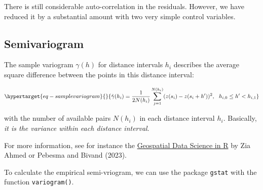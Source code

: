 \documentclass[
  letterpaper,
  DIV=11,
  numbers=noendperiod]{scrreprt}
\newenvironment{Shaded}{\begin{snugshade}}{\end{snugshade}}
\newcommand{\AttributeTok}[1]{\textcolor[rgb]{0.40,0.45,0.13}{#1}}
\newcommand{\CommentTok}[1]{\textcolor[rgb]{0.37,0.37,0.37}{#1}}
\newcommand{\DecValTok}[1]{\textcolor[rgb]{0.68,0.00,0.00}{#1}}
\newcommand{\FloatTok}[1]{\textcolor[rgb]{0.68,0.00,0.00}{#1}}
\newcommand{\FunctionTok}[1]{\textcolor[rgb]{0.28,0.35,0.67}{#1}}
\newcommand{\NormalTok}[1]{\textcolor[rgb]{0.00,0.23,0.31}{#1}}
\newcommand{\OtherTok}[1]{\textcolor[rgb]{0.00,0.23,0.31}{#1}}
\newcommand{\SpecialCharTok}[1]{\textcolor[rgb]{0.37,0.37,0.37}{#1}}
\begin{document}
There is still considerable auto-correlation in the residuals. However,
we have reduced it by a substantial amount with two very simple control
variables.

\hypertarget{semivariogram}{%
\subsection{Semivariogram}\label{semivariogram}}

The sample variogram \(\gamma(h)\) for distance intervals \(h_i\)
describes the average square difference between the points in this
distance interval:

\begin{equation}\protect\hypertarget{eq-samplevariogram}{}{
\hat{\gamma}(h_i) = \frac{1}{2N(h_i)}\sum_{j=1}^{N(h_i)}(z(s_i)-z(s_i+h'))^2, \ \ h_{i,0} \le h' < h_{i,1}
}\label{eq-samplevariogram}\end{equation}

with the number of available pairs \(N(h_i)\) in each distance interval
\(h_i\). Basically, \emph{it is the variance within each distance
interval}.

For more information, see for instance the
\href{https://zia207.github.io/geospatial-r-github.io/semivariogram-modeling.html}{Geospatial
Data Science in R} by Zia Ahmed or Pebesma and Bivand (2023).

To calculate the empirical semi-vriogram, we can use the package
\texttt{gstat} with the function \texttt{variogram()}.

\begin{Shaded}
\end{Shaded}
\end{document}
